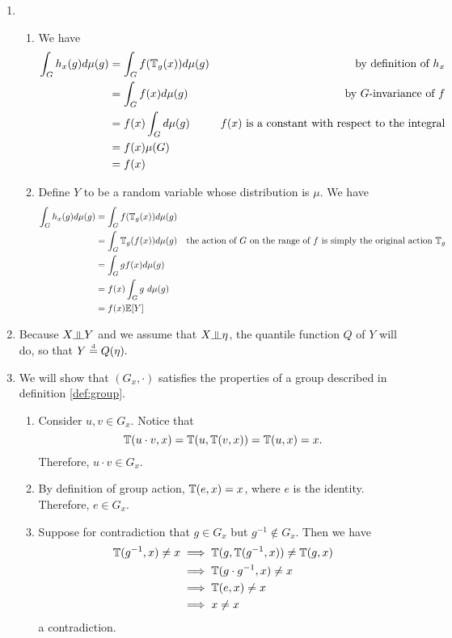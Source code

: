 \begin{enumerate}
\item
\begin{enumerate}[label=(\alph*)]
	\item
	We have
	$$
	\begin{aligned}
		\int_{G} h_x(g) d \mu(g) & = \int_G f(\mathbb{T}_g(x)) d \mu(g) & \textrm{by definition of $h_x$} \\
		                         & = \int_G f(x) d \mu(g) & \textrm{by $G$-invariance of $f$} \\
		                         & = f(x) \int_G d \mu(g) & \textrm{$f(x)$ is a constant with respect to the integral} \\
		                         & = f(x) \mu(G) \\
		                         & = f(x)
	\end{aligned}
	$$
	
	\item
	Define $Y$ to be a random variable whose distribution is $\mu$.
	We have
	$$
	\begin{aligned}
		\int_G h_x(g) d \mu(g) & = \int_G f(\mathbb{T}_g(x)) d \mu(g) \\
		                       & = \int_G \mathbb{T}_g(f(x)) d \mu(g) & \textrm{the action of $G$ on the range of $f$ is simply the original action $\mathbb{T}_g$} \\ 
		                       & = \int_G g f(x) d \mu(g) \\
		                       & = f(x) \int_G g\ d \mu(g) \\
		                       & = f(x) \mathbb{E}[Y]
	\end{aligned}
	$$
\end{enumerate}

\item 
Because $X \indep Y$ and we assume that $X \indep \eta$, the quantile function $Q$ of $Y$ will do, so that
$
	Y \stackrel{\text{\rm\tiny d}}{=} Q(\eta).
$

\item We will show that $(G_x, \cdot)$ satisfies the properties of a group described in definition \ref{def:group}.
\begin{enumerate}
	\item
	Consider $u,v \in G_x$.
	Notice that
	$$
		\mathbb{T}(u \cdot v, x) = \mathbb{T}(u, \mathbb{T}(v,x)) = \mathbb{T}(u, x) = x.
	$$
	Therefore, $u \cdot v \in G_x$.
	
	\item
	By definition of group action, $\mathbb{T}(e,x) = x$, where $e$ is the identity.
	Therefore, $e \in G_x$.
	
	\item
	Suppose for contradiction that $g \in G_x$ but $g^{-1} \not \in G_x$.
	Then we have
	$$
	\begin{aligned} 
		\mathbb{T}(g^{-1},x) \neq x & \implies \mathbb{T}(g, \mathbb{T}(g^{-1}, x)) \neq \mathbb{T}(g, x) \\
		& \implies \mathbb{T}(g\cdot g^{-1}, x) \neq x \\
		& \implies \mathbb{T}(e, x) \neq x \\
		& \implies x \neq x
	\end{aligned}
	$$
	a contradiction.
\end{enumerate}
\end{enumerate}